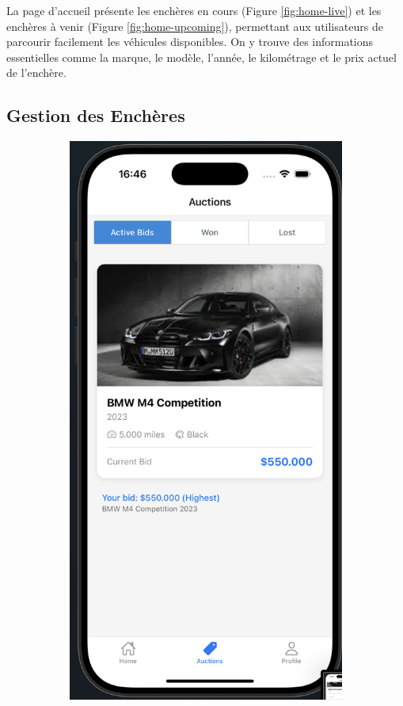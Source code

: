 La page d'accueil présente les enchères en cours (Figure \ref{fig:home-live}) et les enchères à venir (Figure \ref{fig:home-upcoming}), permettant aux utilisateurs de parcourir facilement les véhicules disponibles. On y trouve des informations essentielles comme la marque, le modèle, l'année, le kilométrage et le prix actuel de l'enchère.

\subsection{Gestion des Enchères}

\begin{figure}[H]
    \centering
    \begin{subfigure}[b]{0.32\textwidth}
        \includegraphics[width=\textwidth]{images/auction page with active bids.png}

\end{subfigure}
\end{figure}
